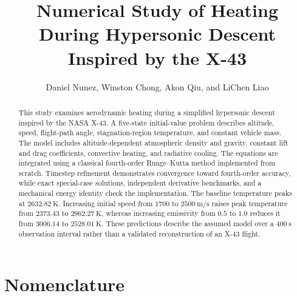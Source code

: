 \documentclass[conf]{new-aiaa}
\title{Numerical Study of Heating During Hypersonic Descent Inspired by the X-43}
\author{Daniel Nunez, Winston Chong, Akon Qiu, and LiChen Liao}
\begin{document}
\maketitle

\begin{abstract}
This study examines aerodynamic heating during a simplified hypersonic descent
inspired by the NASA X-43. A five-state initial-value problem describes altitude,
speed, flight-path angle, stagnation-region temperature, and constant vehicle mass.
The model includes altitude-dependent atmospheric density and gravity, constant
lift and drag coefficients, convective heating, and radiative cooling.
The equations are integrated using a classical fourth-order Runge--Kutta method
implemented from scratch. Timestep refinement demonstrates convergence toward
fourth-order accuracy, while exact special-case solutions, independent derivative
benchmarks, and a mechanical energy identity check the implementation. The baseline temperature peaks at
$2632.82~\mathrm{K}$. Increasing initial speed from $1700$ to
$2500~\mathrm{m/s}$ raises peak temperature from $2373.43$ to
$2962.27~\mathrm{K}$, whereas increasing emissivity from $0.5$ to $1.0$
reduces it from $3006.14$ to $2528.01~\mathrm{K}$.
These predictions describe the assumed model over a $400~\mathrm{s}$
observation interval rather than a validated reconstruction of an X-43 flight.
\end{abstract}

\section{Nomenclature}
\end{document}
